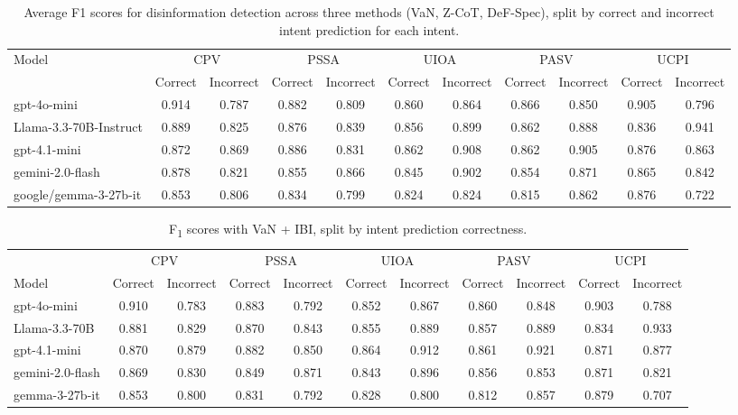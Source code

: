 \documentclass[11pt]{article}
\begin{document}
\begin{table}[h!]
\centering
\scriptsize
\setlength{\tabcolsep}{5pt}
\begin{tabular}{lcccccccccc}
\toprule
\multirow{2}{*}{Model} & \multicolumn{2}{c}{CPV} & \multicolumn{2}{c}{PSSA} & \multicolumn{2}{c}{UIOA} & \multicolumn{2}{c}{PASV} & \multicolumn{2}{c}{UCPI} \\
\cmidrule(lr){2-3} \cmidrule(lr){4-5} \cmidrule(lr){6-7} \cmidrule(lr){8-9} \cmidrule(lr){10-11}
 & Correct & Incorrect & Correct & Incorrect & Correct & Incorrect & Correct & Incorrect & Correct & Incorrect \\
\midrule
gpt-4o-mini & 0.914 & 0.787 & 0.882 & 0.809 & 0.860 & 0.864 & 0.866 & 0.850 & 0.905 & 0.796 \\
Llama-3.3-70B-Instruct & 0.889 & 0.825 & 0.876 & 0.839 & 0.856 & 0.899 & 0.862 & 0.888 & 0.836 & 0.941 \\
gpt-4.1-mini & 0.872 & 0.869 & 0.886 & 0.831 & 0.862 & 0.908 & 0.862 & 0.905 & 0.876 & 0.863 \\
gemini-2.0-flash & 0.878 & 0.821 & 0.855 & 0.866 & 0.845 & 0.902 & 0.854 & 0.871 & 0.865 & 0.842 \\
google/gemma-3-27b-it & 0.853 & 0.806 & 0.834 & 0.799 & 0.824 & 0.824 & 0.815 & 0.862 & 0.876 & 0.722 \\
\bottomrule
\end{tabular}
\caption{Average F1 scores for disinformation detection across three methods (VaN, Z-CoT, DeF-Spec), split by correct and incorrect intent prediction for each intent.}
\label{tab:average_intent_influence}
\end{table}




\begin{table}[!ht]
\scriptsize
\centering
\begin{tabular}{lcc|cc|cc|cc|cc}
\toprule
 & \multicolumn{2}{c}{CPV} & \multicolumn{2}{c}{PSSA} & \multicolumn{2}{c}{UIOA} & \multicolumn{2}{c}{PASV} & \multicolumn{2}{c}{UCPI} \\
\cmidrule(lr){2-3} \cmidrule(lr){4-5} \cmidrule(lr){6-7} \cmidrule(lr){8-9} \cmidrule(lr){10-11}
Model & Correct & Incorrect & Correct & Incorrect & Correct & Incorrect & Correct & Incorrect & Correct & Incorrect \\
\midrule
gpt-4o-mini & 0.910 & 0.783 & 0.883 & 0.792 & 0.852 & 0.867 & 0.860 & 0.848 & 0.903 & 0.788 \\
Llama-3.3-70B & 0.881 & 0.829 & 0.870 & 0.843 & 0.855 & 0.889 & 0.857 & 0.889 & 0.834 & 0.933 \\
gpt-4.1-mini & 0.870 & 0.879 & 0.882 & 0.850 & 0.864 & 0.912 & 0.861 & 0.921 & 0.871 & 0.877 \\
gemini-2.0-flash & 0.869 & 0.830 & 0.849 & 0.871 & 0.843 & 0.896 & 0.856 & 0.853 & 0.871 & 0.821 \\
gemma-3-27b-it & 0.853 & 0.800 & 0.831 & 0.792 & 0.828 & 0.800 & 0.812 & 0.857 & 0.879 & 0.707 \\
\bottomrule
\end{tabular}
\caption{F\textsubscript{1} scores with VaN + IBI, split by intent prediction correctness.}
\label{tab:van_intent_influence}
\end{table}
\end{document}

